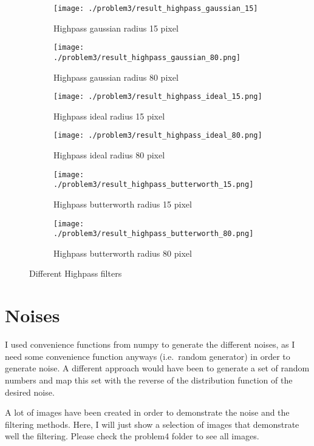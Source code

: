 \documentclass[a4paper]{scrartcl}
\begin{document}
\begin{figure}[H]
    \centering
    \begin{subfigure}[t]{0.4\textwidth}
      \texttt{[image: ./problem3/result\_highpass\_gaussian\_15]}
        \caption{Highpass gaussian radius 15 pixel}
    \end{subfigure}
    \begin{subfigure}[t]{0.4\textwidth}
      \texttt{[image: ./problem3/result\_highpass\_gaussian\_80.png]}
        \caption{Highpass gaussian radius 80 pixel}
    \end{subfigure}
    \begin{subfigure}[t]{0.4\textwidth}
      \texttt{[image: ./problem3/result\_highpass\_ideal\_15.png]}
        \caption{Highpass ideal radius 15 pixel}
    \end{subfigure}
    \begin{subfigure}[t]{0.4\textwidth}
      \texttt{[image: ./problem3/result\_highpass\_ideal\_80.png]}
        \caption{Highpass ideal radius 80 pixel}
    \end{subfigure}
    \begin{subfigure}[t]{0.4\textwidth}
      \texttt{[image: ./problem3/result\_highpass\_butterworth\_15.png]}
        \caption{Highpass butterworth radius 15 pixel}
    \end{subfigure}
    \begin{subfigure}[t]{0.4\textwidth}
      \texttt{[image: ./problem3/result\_highpass\_butterworth\_80.png]}
        \caption{Highpass butterworth radius 80 pixel}
    \end{subfigure}

    \caption{Different Highpass filters}
    \label{fig:highpassfilters}
\end{figure}

\section{Noises}

I used convenience functions from numpy to generate the different noises, as I need some convenience function anyways (i.e.\ random generator) in order to generate noise. A different approach would have been to generate a set of random numbers and map this set with the reverse of the distribution function of the desired noise.

A lot of images have been created in order to demonstrate the noise and the filtering methods. Here, I will just show a selection of images that demonstrate well the filtering. Please check the problem4 folder to see all images.
\end{document}

